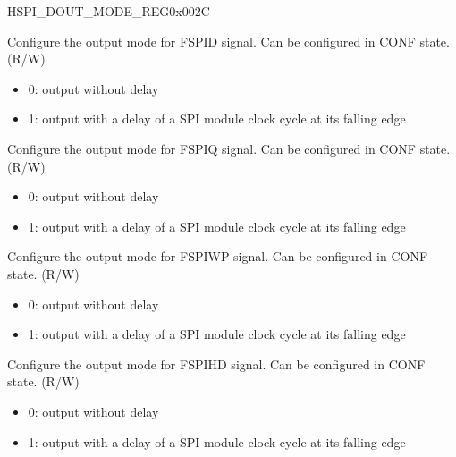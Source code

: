 \begin{register}{H}{SPI\_DOUT\_MODE\_REG}{0x002C}\label{regdesc:SPIDOUTMODEREG}
%
%
%
%
%
\regnewline%
\begin{regdesc}\begin{reglist}
\label{fielddesc:SPIDOUT0MODE}\item [SPI\_DOUT0\_MODE] Configure the output mode for FSPID signal. Can be configured in CONF state. (R/W)
\begin{itemize}
    \item 0: output without delay
    \item 1: output with a delay of a SPI module clock cycle at its falling edge
\end{itemize}
\label{fielddesc:SPIDOUT1MODE}\item [SPI\_DOUT1\_MODE] Configure the output mode for FSPIQ signal. Can be configured in CONF state. (R/W)
\begin{itemize}
    \item 0: output without delay
    \item 1: output with a delay of a SPI module clock cycle at its falling edge
\end{itemize}
\label{fielddesc:SPIDOUT2MODE}\item [SPI\_DOUT2\_MODE] Configure the output mode for FSPIWP signal. Can be configured in CONF state. (R/W)
\begin{itemize}
    \item 0: output without delay
    \item 1: output with a delay of a SPI module clock cycle at its falling edge
\end{itemize}
\label{fielddesc:SPIDOUT3MODE}\item [SPI\_DOUT3\_MODE] Configure the output mode for FSPIHD signal. Can be configured in CONF state. (R/W)
\begin{itemize}
    \item 0: output without delay
    \item 1: output with a delay of a SPI module clock cycle at its falling edge
\end{itemize}
\end{reglist}\end{regdesc}
\end{register}


